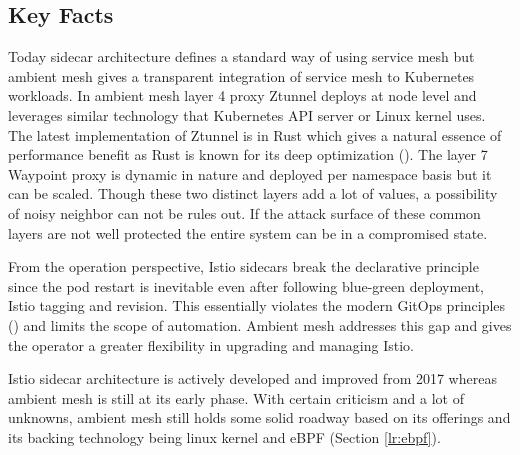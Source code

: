 \subsection{Key Facts}
Today sidecar architecture defines a standard way of using service mesh but ambient mesh gives a transparent integration of service mesh to Kubernetes workloads. In ambient mesh layer 4 proxy Ztunnel deploys at node level and leverages similar technology that Kubernetes API server or Linux kernel uses. The latest implementation of Ztunnel is in Rust which gives a natural essence of performance benefit as Rust is known for its deep optimization (\cite{rustAdoption}). The layer 7 Waypoint proxy is dynamic in nature and deployed per namespace basis but it can be scaled. Though these two distinct layers add a lot of values, a possibility of noisy neighbor can not be rules out. If the attack surface of these common layers are not well protected the entire system can be in a compromised state.

From the operation perspective, Istio sidecars break the declarative principle since the pod restart is inevitable even after following blue-green deployment, Istio tagging and revision. This essentially violates the modern GitOps principles (\cite{gitopsBook}) and limits the scope of automation. Ambient mesh addresses this gap and gives the operator a greater flexibility in upgrading and managing Istio.

Istio sidecar architecture is actively developed and improved from 2017 whereas ambient mesh is still at its early phase. With certain criticism and a lot of unknowns, ambient mesh still holds some solid roadway based on its offerings and its backing technology being linux kernel and eBPF (Section \ref{lr:ebpf}).